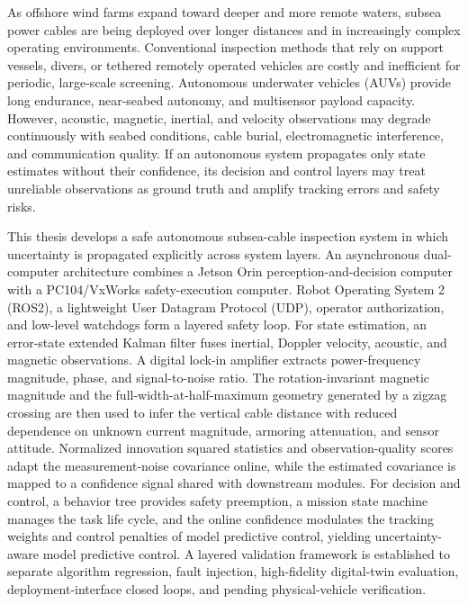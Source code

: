 \begin{abstract*}
  As offshore wind farms expand toward deeper and more remote waters, subsea power cables are being deployed over longer distances and in increasingly complex operating environments. Conventional inspection methods that rely on support vessels, divers, or tethered remotely operated vehicles are costly and inefficient for periodic, large-scale screening. Autonomous underwater vehicles (AUVs) provide long endurance, near-seabed autonomy, and multisensor payload capacity. However, acoustic, magnetic, inertial, and velocity observations may degrade continuously with seabed conditions, cable burial, electromagnetic interference, and communication quality. If an autonomous system propagates only state estimates without their confidence, its decision and control layers may treat unreliable observations as ground truth and amplify tracking errors and safety risks.

  This thesis develops a safe autonomous subsea-cable inspection system in which uncertainty is propagated explicitly across system layers. An asynchronous dual-computer architecture combines a Jetson Orin perception-and-decision computer with a PC104/VxWorks safety-execution computer. Robot Operating System 2 (ROS2), a lightweight User Datagram Protocol (UDP), operator authorization, and low-level watchdogs form a layered safety loop. For state estimation, an error-state extended Kalman filter fuses inertial, Doppler velocity, acoustic, and magnetic observations. A digital lock-in amplifier extracts power-frequency magnitude, phase, and signal-to-noise ratio. The rotation-invariant magnetic magnitude and the full-width-at-half-maximum geometry generated by a zigzag crossing are then used to infer the vertical cable distance with reduced dependence on unknown current magnitude, armoring attenuation, and sensor attitude. Normalized innovation squared statistics and observation-quality scores adapt the measurement-noise covariance online, while the estimated covariance is mapped to a confidence signal shared with downstream modules. For decision and control, a behavior tree provides safety preemption, a mission state machine manages the task life cycle, and the online confidence modulates the tracking weights and control penalties of model predictive control, yielding uncertainty-aware model predictive control. A layered validation framework is established to separate algorithm regression, fault injection, high-fidelity digital-twin evaluation, deployment-interface closed loops, and pending physical-vehicle verification.


\end{abstract*}
